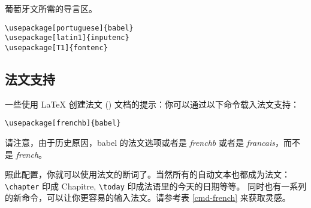 \begin{table}[btp]
\caption{葡萄牙文所需的导言区。} \label{portuguese}
\begin{lined}{5cm}
\begin{verbatim}
\usepackage[portuguese]{babel}
\usepackage[latin1]{inputenc}
\usepackage[T1]{fontenc}
\end{verbatim}
\end{lined}
\end{table}


\subsection{法文支持}
一些使用 \LaTeX{} 创建法文 () 文档的提示：你可以通过以下命令载入法文支持：
\begin{lscommand}
\verb|\usepackage[frenchb]{babel}|
\end{lscommand}

请注意，由于历史原因，\textsf{babel} 的法文选项或者是 \emph{frenchb} 或者是 \emph{francais}，而不是 \emph{french}。

照此配置，你就可以使用法文的断词了。当然所有的自动文本也都成为法文：
\verb+\chapter+ 印成 Chapitre, \verb+\today+ 印成法语里的今天的日期等等。
同时也有一系列的新命令，可以让你更容易的输入法文。请参考表 \ref{cmd-french} 来获取灵感。

